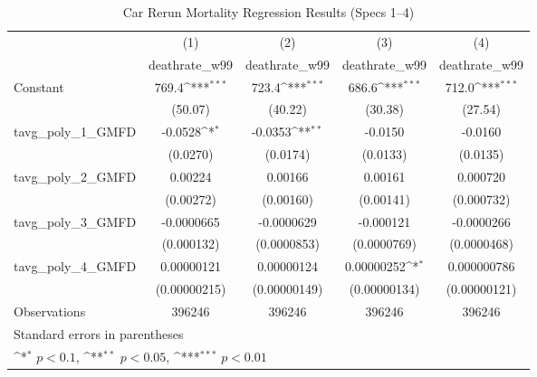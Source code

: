\begin{table}[htbp]\centering
\def\sym#1{\ifmmode^{#1}\else\(^{#1}\)\fi}
\caption{Car Rerun Mortality Regression Results (Specs 1–4)}
\begin{tabular}{l*{4}{c}}
\hline\hline
                    &\multicolumn{1}{c}{(1)}&\multicolumn{1}{c}{(2)}&\multicolumn{1}{c}{(3)}&\multicolumn{1}{c}{(4)}\\
                    &\multicolumn{1}{c}{deathrate\_w99}&\multicolumn{1}{c}{deathrate\_w99}&\multicolumn{1}{c}{deathrate\_w99}&\multicolumn{1}{c}{deathrate\_w99}\\
\hline
Constant            &       769.4\sym{***}&       723.4\sym{***}&       686.6\sym{***}&       712.0\sym{***}\\
                    &     (50.07)         &     (40.22)         &     (30.38)         &     (27.54)         \\
[1em]
tavg\_poly\_1\_GMFD    &     -0.0528\sym{*}  &     -0.0353\sym{**} &     -0.0150         &     -0.0160         \\
                    &    (0.0270)         &    (0.0174)         &    (0.0133)         &    (0.0135)         \\
[1em]
tavg\_poly\_2\_GMFD    &     0.00224         &     0.00166         &     0.00161         &    0.000720         \\
                    &   (0.00272)         &   (0.00160)         &   (0.00141)         &  (0.000732)         \\
[1em]
tavg\_poly\_3\_GMFD    &  -0.0000665         &  -0.0000629         &   -0.000121         &  -0.0000266         \\
                    &  (0.000132)         & (0.0000853)         & (0.0000769)         & (0.0000468)         \\
[1em]
tavg\_poly\_4\_GMFD    &  0.00000121         &  0.00000124         &  0.00000252\sym{*}  & 0.000000786         \\
                    &(0.00000215)         &(0.00000149)         &(0.00000134)         &(0.00000121)         \\
\hline
Observations        &      396246         &      396246         &      396246         &      396246         \\
\hline\hline
\multicolumn{5}{l}{\footnotesize Standard errors in parentheses}\\
\multicolumn{5}{l}{\footnotesize \sym{*} \(p<0.1\), \sym{**} \(p<0.05\), \sym{***} \(p<0.01\)}\\
\end{tabular}
\end{table}
